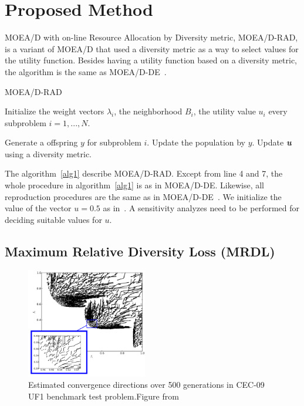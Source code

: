 \section{Proposed Method}

MOEA/D with on-line Resource Allocation by Diversity metric, MOEA/D-RAD, is a variant of MOEA/D that used a diversity metric as a way to select values for the utility function. Besides having a utility function based on a diversity metric, the algorithm is the same as MOEA/D-DE~\cite{li2009multiobjective}.

\begin{algorithm}[h]
	\caption{MOEA/D-RAD}\label{alg1}
	\begin{algorithmic}[1]

	\State Initialize the weight vectors $\lambda_i$, the neighborhood $B_i$, the utility value $u_i$ every subproblem $i=1,...,N$.
		
				\State Generate a offspring $y$ for subproblem $i$.
				\State Update the population by $y$.
			\EndIf
	\EndFor
	\State Update \textit{\textbf{u}} using a diversity metric.
		\EndWhile
	\end{algorithmic}
\end{algorithm}


The algorithm~\ref{alg1} describe MOEA/D-RAD. Except from line 4 and 7, the whole procedure in algorithm~\ref{alg1} is as in MOEA/D-DE. Likewise, all reproduction procedures are the same as in MOEA/D-DE~\cite{li2009multiobjective}. We initialize the value of the vector $u=0.5$ as in~\cite{zhou2016all}. A sensitivity analyzes need to be performed for deciding suitable values for $u$.

\subsection{Maximum Relative Diversity Loss (MRDL)} 

\begin{figure}[!t]
	\centering
	\includegraphics[width=0.47\textwidth]{img/conv_dir}
	\caption{Estimated convergence directions over 500 generations in CEC-09 UF1 benchmark test problem.Figure from~\cite{gee2015online}}
	\label{fig4}
\end{figure}

